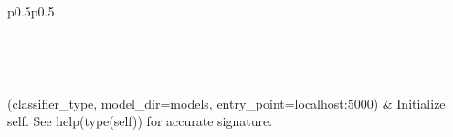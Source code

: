 \documentclass[letterpaper,10pt,english]{sphinxmanual}
\begin{document}
\begin{savenotes}\sphinxatlongtablestart\begin{longtable}[c]{p{0.5\linewidth}p{0.5\linewidth}}
\hline

\endfirsthead

%
{}\\
\hline

\endhead

\hline
{}\\
\endfoot

\endlastfoot

{\hyperref[\detokenize{autoapi/pine/pipelines/NERWrapper/index:pine.pipelines.NERWrapper.NERWrapper}]{}}(classifier\_type, model\_dir=\textquotesingle{}models\textquotesingle{}, entry\_point=\textquotesingle{}localhost:5000\textquotesingle{})
&
Initialize self.  See help(type(self)) for accurate signature.
\\
\hline
\end{longtable}\sphinxatlongtableend\end{savenotes}
\end{document}
